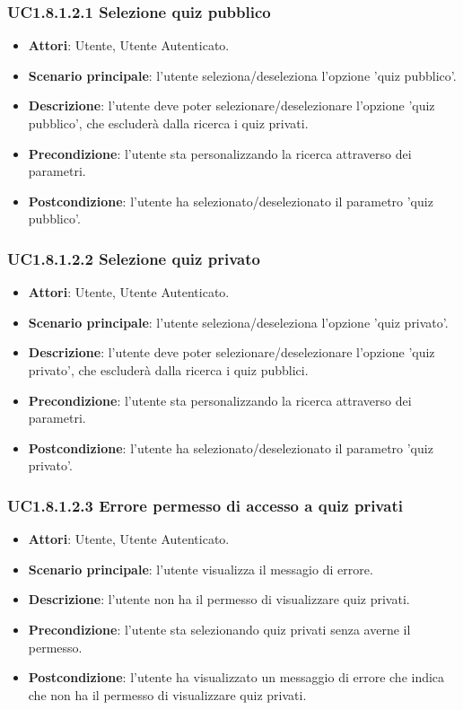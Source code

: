 \subsubsection{UC1.8.1.2.1 Selezione quiz pubblico}
\begin{itemize}
\item \textbf{Attori}: Utente, Utente Autenticato.
\item \textbf{Scenario principale}: l'utente seleziona/deseleziona l'opzione 'quiz pubblico'.
\item \textbf{Descrizione}: l'utente deve poter selezionare/deselezionare l'opzione 'quiz pubblico', che escluderà dalla ricerca i quiz privati.
\item \textbf{Precondizione}: l'utente sta personalizzando la ricerca attraverso dei parametri.
\item \textbf{Postcondizione}: l'utente ha selezionato/deselezionato il parametro 'quiz pubblico'.
\end{itemize}
\subsubsection{UC1.8.1.2.2 Selezione quiz privato}
\begin{itemize}
\item \textbf{Attori}: Utente, Utente Autenticato.
\item \textbf{Scenario principale}: l'utente seleziona/deseleziona l'opzione 'quiz privato'.
\item \textbf{Descrizione}: l'utente deve poter selezionare/deselezionare l'opzione 'quiz privato', che escluderà dalla ricerca i quiz pubblici.
\item \textbf{Precondizione}: l'utente sta personalizzando la ricerca attraverso dei parametri.
\item \textbf{Postcondizione}: l'utente ha selezionato/deselezionato il parametro 'quiz privato'.
\end{itemize}
\subsubsection{UC1.8.1.2.3 Errore permesso di accesso a quiz privati}
\begin{itemize}
\item \textbf{Attori}: Utente, Utente Autenticato.
\item \textbf{Scenario principale}: l'utente visualizza il messagio di errore.
\item \textbf{Descrizione}: l'utente non ha il permesso di visualizzare quiz privati.
\item \textbf{Precondizione}: l'utente sta selezionando  quiz privati senza averne il permesso.
\item \textbf{Postcondizione}: l'utente ha visualizzato un messaggio di errore che indica che non ha il permesso di visualizzare quiz privati.
\end{itemize}
